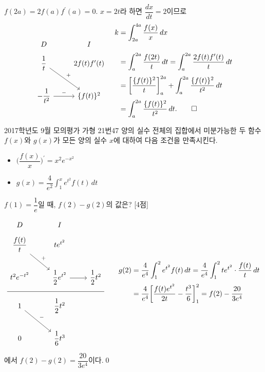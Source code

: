 \documentclass{article}
\begin{document}
\begin{sol}
	$f(2a)=2f(a)f^{\prime}(a)=0$. $x=2t$라 하면 $\dfrac{dx}{dt}=2$이므로
	\[
		\begin{tikzcd}
			D & I \\[-12pt]
			\dfrac{1}{t} \arrow[rd, "+"] & 2f(t)f^\prime(t) \\
			-\dfrac{1}{t^2} \arrow[r, "-"] & \{f(t)\}^2
		\end{tikzcd}\quad\begin{aligned}
			k&=\int_{2a}^{4a}\frac{f(x)}{x}\,dx\\[12pt]&=\int_a^{2a}\frac{f(2t)}{t}\,dt=\int_a^{2a}\frac{2f(t)f^{\prime}(t)}{t}\,dt\\[3pt]
			&=\biggl[\frac{\{f(t)\}^2}{t}\biggr]_a^{2a}+\int_a^{2a}\frac{\{f(t)\}^2}{t^2}\,dt\\[3pt]
			&=\int_a^{2a}\frac{\{f(t)\}^2}{t^2}\,dt.\qed
		\end{aligned}
	\]
\end{sol}

\newpage
\begin{prob}{2017학년도 9월 모의평가 가형 21번}{47}
	양의 실수 전체의 집합에서 미분가능한 두 함수 $f(x)$와 $g(x)$가 모든 양의 실수 $x$에 대하여 다음 조건을 만족시킨다.
	\begin{hint}
		\begin{itemize}
			\item[(가)] $\biggl(\dfrac{f(x)}{x}\biggr)^{\prime}=x^2e^{-x^2}$
			\item[(나)] $g(x)=\dfrac{4}{e^2}\displaystyle\int_1^xe^{t^2}f(t)\,dt$
		\end{itemize}
	\end{hint}
	$f(1)=\dfrac{1}{e}$일 때, $f(2)-g(2)$의 값은? [4점]
\end{prob}

\begin{sol}
	\[
		\begin{tikzcd}
			D & I & \\[-12pt]
			\dfrac{f(t)}{t} \arrow[rd, "+"] & te^{t^2} & \\
			t^2e^{-t^2} & \dfrac{1}{2}e^{t^2} \arrow[r] & \dfrac{1}{2}t^2 \\[-12pt] \hline \\[-12pt]
			1 \arrow[rd, "-"] & \dfrac{1}{2}t^2 & \\
			0 & \dfrac{1}{6}t^3
		\end{tikzcd}\qquad\begin{aligned}
			g(2)&=\frac{4}{e^4}\int_1^2e^{t^2}f(t)\,dt=\frac{4}{e^4}\int_1^2te^{t^2}\cdot\frac{f(t)}{t}\,dt\\[3pt]
			&=\frac{4}{e^4}\biggl[\frac{f(t)e^{t^2}}{2t}-\frac{t^3}{6}\biggr]_1^2=f(2)-\frac{20}{3e^4}
		\end{aligned}
	\]
	에서 $f(2)-g(2)=\dfrac{20}{3e^4}$이다.\qed
\end{sol}
\end{document}
